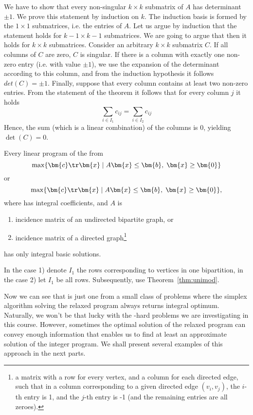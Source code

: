 \begin{dokaz}
  We have to show that every non-singular $k\times k$  submatrix of $A$ has determinant  $\pm1$. We prove
  this statement by induction on $k$. The induction basis is formed by the $1\times1$ submatrices, i.e. the
  entries of $A$. Let us argue by induction that the statement holds for $k-1\times k-1$ submatrices. We are
  going to argue that then it holds for $k\times k$ submatrices. Consider an arbitrary $k\times k$ submatrix $C$. 
  If all columns of $C$ are zero, $C$ is singular. If there is a column with exactly one non-zero entry (i.e.
  with value $\pm1$), we use the expansion of the determinant according to this column, and from the induction
  hypothesis it follows $det(C)=\pm1$. Finally, suppose that every column contains at least two non-zero entries.
  From the statement of the theorem it follows that for every column $j$ it holds
  $$\sum\limits_{i\in I_1}c_{ij}=\sum\limits_{i\in I_2}c_{ij}$$
  Hence, the sum (which is a linear combination) of the columns is $0$, yielding $\det(C)=0$.
\end{dokaz}

\begin{dosl}
  Every linear program of the from
  $$\max\{\bm{c}\tr\bm{x}\mid A\bm{x}\le\bm{b},\;\bm{x}\ge\bm{0}\}$$ or
  $$\max\{\bm{c}\tr\bm{x}\mid A\bm{x}\le\bm{b},\;\bm{x}\ge\bm{0}\},$$ where 
  has integral coefficients, and $A$ is
   \begin{enumerate}
     \item incidence matrix of an undirected bipartite graph, or
     \item incidence matrix of a directed graph\footnote{a  matrix with a row for every vertex, and a column for each
         directed edge, such that in a column corresponding to a given directed edge $(v_i,v_j)$, the 
       $i$-th entry is 1, and the $j$-th entry is -1 (and the remaining entries are all zeroes).}
   \end{enumerate}
   has only integral basic solutions.
\end{dosl}
\begin{dokaz}
  In the case 1) denote $I_1$ the rows corresponding to vertices in one bipartition,
  in the case 2) let $I_1$ be all rows. Subsequently, use Theorem~\ref{thm:unimod}.
\end{dokaz}

\noindent
Now we can see that \maxWBmatching is just one from a small class of problems where the simplex algorithm 
solving the relaxed program always returns integral optimum. Naturally, we won't be that lucky with the 
\NP-hard problems we are investigating in this course. However, sometimes the optimal solution
of the relaxed program can convey enough information that enables us to find at least an approximate
solution of the integer program. We shall present several examples of this approach in the next parts.

